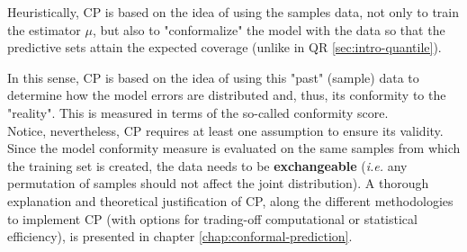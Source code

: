 Heuristically, CP is based on the idea of using the samples data, not only to train the estimator $\mu$, but also to "conformalize" the model with the data so that the predictive sets attain the expected coverage (unlike in QR \ref{sec:intro-quantile}). 

In this sense, CP is based on the idea of using this "past" (sample) data to determine how the model errors are distributed and, thus, its conformity to the "reality". This is measured in terms of the so-called conformity score.\\ 

Notice, nevertheless, CP requires at least one assumption to ensure its validity. Since the model conformity measure is evaluated on the same samples from which the training set is created, the data needs to be \textbf{exchangeable} (\textit{i.e.} any permutation of samples should not affect the joint distribution). A thorough explanation and theoretical justification of CP, along the different methodologies to implement CP (with options for trading-off computational or statistical efficiency), is presented in chapter \ref{chap:conformal-prediction}.